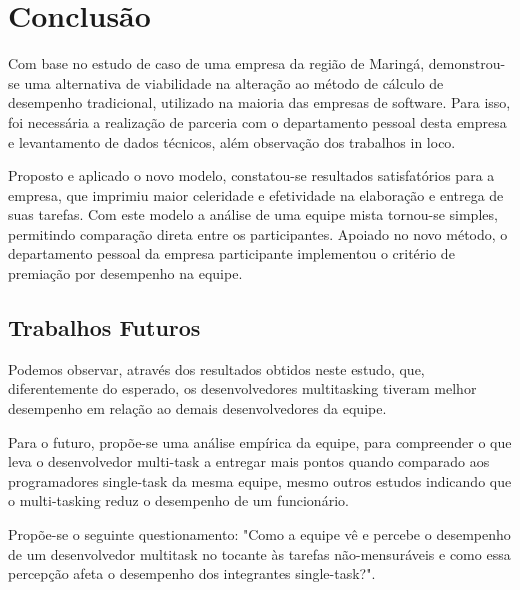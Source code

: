 \section{Conclusão}
Com base no estudo de caso de uma empresa da região de Maringá, demonstrou-se uma alternativa de viabilidade na alteração ao método de cálculo de desempenho tradicional, utilizado na maioria das empresas de software. Para isso, foi necessária a realização de parceria com o departamento pessoal desta empresa e levantamento de dados  técnicos, além observação dos trabalhos in loco.\par

Proposto e aplicado o novo modelo, constatou-se resultados satisfatórios para a empresa, que imprimiu maior celeridade e efetividade na elaboração e entrega de suas tarefas. Com este modelo a análise de uma equipe mista tornou-se simples, permitindo comparação direta entre os participantes. Apoiado no novo método, o departamento pessoal da empresa participante implementou o critério de premiação por desempenho na equipe.\par
\subsection{Trabalhos Futuros}
Podemos observar, através dos resultados obtidos neste estudo, que, diferentemente do esperado, os desenvolvedores multitasking tiveram melhor desempenho em relação ao demais desenvolvedores da equipe.\par

Para o futuro, propõe-se uma análise empírica da equipe, para compreender o que leva o desenvolvedor multi-task a entregar mais pontos quando comparado aos programadores single-task da mesma equipe, mesmo outros estudos indicando que o multi-tasking reduz o desempenho de um funcionário.\par 

Propõe-se o seguinte questionamento: "Como a equipe vê e percebe o desempenho de um desenvolvedor multitask no tocante às tarefas não-mensuráveis e como essa percepção afeta o desempenho dos integrantes single-task?".
